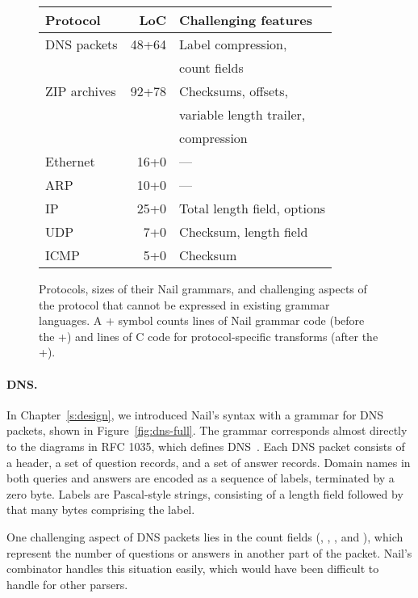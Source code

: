 \begin{figure}[tb]
\centering
\begin{tabular}{lrl}
\toprule
\textbf{Protocol} & \textbf{LoC} & \textbf{Challenging features} \\ 
\midrule
DNS packets & 48+64 & Label compression,\\
  & & count fields \\
ZIP archives & 92+78 & Checksums, offsets, \\ 
  & & variable length trailer, \\
  & & compression \\
Ethernet  & 16+0\phantom{0} & --- \\
ARP       & 10+0\phantom{0} & --- \\
IP        & 25+0\phantom{0} & Total length field, options \\
UDP       &  7+0\phantom{0} & Checksum, length field \\
ICMP      &  5+0\phantom{0} & Checksum \\
\bottomrule
\end{tabular}

\caption{Protocols, sizes of their Nail grammars, and challenging aspects
of the protocol that cannot be expressed in existing grammar languages.
A + symbol counts lines of Nail grammar code (before the +) and lines of
C code for protocol-specific transforms (after the +).}
\label{fig:eval-protocols}
\end{figure}

\paragraph{DNS.}

In Chapter~\ref{s:design}, we introduced Nail's syntax with a grammar
for DNS packets, shown in Figure~\ref{fig:dns-full}.
The grammar corresponds almost directly to the diagrams in RFC 1035,
which defines DNS~\cite[\S4]{RFC:1035}.  Each DNS packet consists of a
header, a set of question records, and a set of answer records. Domain
names in both queries and answers are encoded as a sequence of labels,
terminated by a zero byte.  Labels are Pascal-style strings, consisting
of a length field followed by that many bytes comprising the label.

One challenging aspect of DNS packets lies in the count fields (,
, , and ), which represent the number of questions
or answers in another part of the packet.  Nail's  combinator
handles this situation easily, which would have been difficult to handle
for other parsers.

